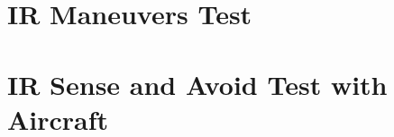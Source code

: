\section{IR Maneuvers Test}
\label{annex:maneuvers}


\section{IR Sense and Avoid Test with Aircraft}
\label{annex:sas}




%
%
%

